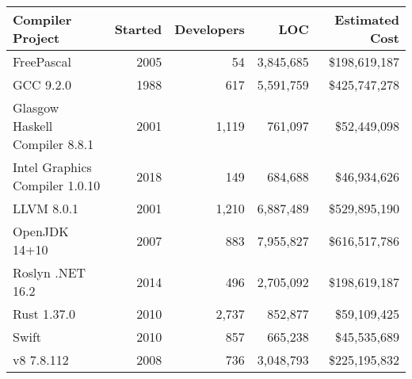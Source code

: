 \begin{tabular}{ | L{3.5cm} r r r r |}
  \hline
  \textbf{Compiler Project} & \textbf{Started} & \textbf{Developers} & \textbf{LOC} & \textbf{Estimated Cost} \\
  \hline
  FreePascal & 2005 & 54 & 3,845,685 & \$198,619,187 \\
  GCC 9.2.0 & 1988 & 617 & 5,591,759 & \$425,747,278 \\
  Glasgow Haskell Compiler 8.8.1 & 2001 & 1,119 & 761,097 & \$52,449,098 \\
  Intel Graphics Compiler 1.0.10 & 2018 & 149 & 684,688 & \$46,934,626 \\
  LLVM 8.0.1 & 2001 & 1,210 & 6,887,489 & \$529,895,190 \\
  OpenJDK 14+10 & 2007 & 883 & 7,955,827 & \$616,517,786 \\
  Roslyn .NET 16.2 & 2014 & 496 & 2,705,092 & \$198,619,187 \\
  Rust 1.37.0 & 2010 & 2,737 & 852,877 & \$59,109,425\\
  Swift & 2010 & 857 & 665,238 & \$45,535,689 \\
  v8 7.8.112 & 2008 & 736 & 3,048,793 & \$225,195,832\\
  \hline
\end{tabular}
